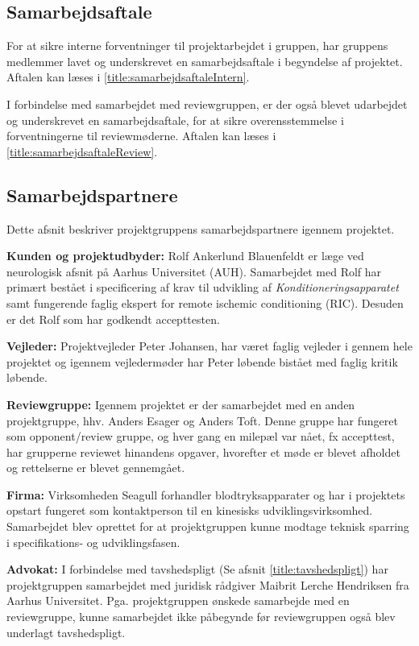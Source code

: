 \subsection{Samarbejdsaftale}
For at sikre interne forventninger til projektarbejdet i gruppen, har gruppens medlemmer lavet og underskrevet en samarbejdsaftale i begyndelse af projektet. Aftalen kan læses i \ref{title:samarbejdsaftaleIntern}.

I forbindelse med samarbejdet med reviewgruppen, er der også blevet udarbejdet og underskrevet en samarbejdsaftale, for at sikre overensstemmelse i forventningerne til reviewmøderne. Aftalen kan læses i \ref{title:samarbejdsaftaleReview}.

\subsection{Samarbejdspartnere} \label{title:samarbejdspartnere}
Dette afsnit beskriver projektgruppens samarbejdspartnere igennem projektet. 

\textbf{Kunden og projektudbyder:} Rolf Ankerlund Blauenfeldt er læge ved neurologisk afsnit på Aarhus Universitet (AUH). Samarbejdet med Rolf har primært bestået i specificering af krav til udvikling af \textit{Konditioneringsapparatet} samt fungerende faglig ekspert for remote ischemic conditioning (RIC). Desuden er det Rolf som har godkendt accepttesten.

\textbf{Vejleder:} Projektvejleder Peter Johansen, har været faglig vejleder i gennem hele projektet og igennem vejledermøder har Peter løbende bistået med faglig kritik løbende. 

\textbf{Reviewgruppe:} Igennem projektet er der samarbejdet med en anden projektgruppe, hhv. Anders Esager og Anders Toft. Denne gruppe har fungeret som opponent/review gruppe, og hver gang en milepæl var nået, fx accepttest, har grupperne reviewet hinandens opgaver, hvorefter et møde er blevet afholdet og rettelserne er blevet gennemgået.  

\textbf{Firma:} Virksomheden Seagull forhandler blodtryksapparater og har i projektets opstart fungeret som kontaktperson til en kinesisks udviklingsvirksomhed. Samarbejdet blev oprettet for at projektgruppen kunne modtage teknisk sparring i specifikations- og udviklingsfasen. 

\textbf{Advokat:} I forbindelse med tavshedspligt (Se afsnit \ref{title:tavshedspligt}) har projektgruppen samarbejdet med juridisk rådgiver Maibrit Lerche Hendriksen fra Aarhus Universitet. Pga. projektgruppen ønskede samarbejde med en reviewgruppe, kunne samarbejdet ikke påbegynde før reviewgruppen også blev underlagt tavshedspligt.

